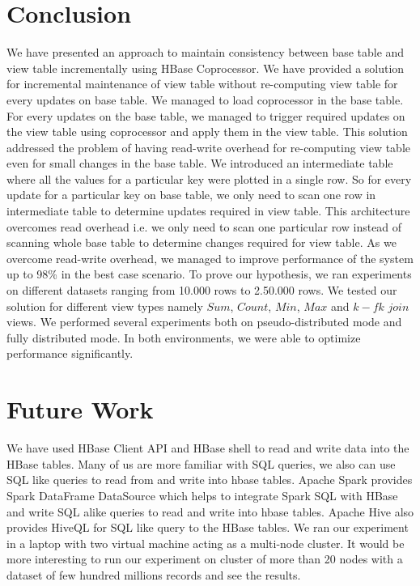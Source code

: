 \documentclass[11pt,a4paper,bibtotoc,idxtotoc,headsepline,footsepline,footexclude,BCOR12mm,DIV13]{scrbook}
\begin{document}
\chapter{Conclusion}
\label{Conclusion}
We have presented an approach to maintain consistency between base table and view table incrementally using HBase Coprocessor. We have provided a solution for incremental maintenance of view table without re-computing view table for every updates on base table. We managed to load coprocessor in the base table. For every updates on the base table, we managed to trigger required updates on the view table using coprocessor and apply them in the view table. This solution addressed the problem of having read-write overhead for re-computing view table even for small changes in the base table. We introduced an intermediate table where all the values for a particular key were plotted in a single row. So for every update for a particular key on base table, we only need to scan one row in intermediate table to determine updates required in view table. This architecture overcomes read overhead i.e. we only need to scan one particular row instead of scanning whole base table to determine changes required for view table. As we overcome read-write overhead, we managed to improve performance of the system up to 98\% in the best case scenario. To prove our hypothesis, we ran experiments on different datasets ranging from 10.000 rows to 2.50.000 rows. We tested our solution for different view types namely $Sum$, $Count$, $Min$, $Max$ and $k-fk$ $join$ views. We performed several experiments both on pseudo-distributed mode and fully distributed mode. In both environments, we were able to optimize performance significantly. 


\chapter{Future Work}
\label{Future Work}
We have used HBase Client API and HBase shell to read and write data into the HBase tables. Many of us are more familiar with SQL queries, we also can use SQL like queries to read from and write into hbase tables. Apache Spark provides Spark DataFrame DataSource which helps to integrate Spark SQL with HBase and write SQL alike queries to read and write into hbase tables. Apache Hive also provides HiveQL for SQL like query to the HBase tables. 
\newline
We ran our experiment in a laptop with two virtual machine acting as a multi-node cluster. It would be more interesting to run our experiment on cluster of more than 20 nodes with a  dataset of few hundred millions records and see the results.
\end{document}
